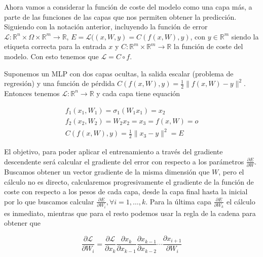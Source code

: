 Ahora vamos a considerar la función de coste del modelo como una capa más, a parte de las funciones de las capas que nos permiten obtener la predicción. Siguiendo con la notación anterior, incluyendo la función de error $\mathcal{L}: \mathbb{R}^n \times \Omega \times \mathbb{R}^m \rightarrow \mathbb{R}$, $E=\mathcal{L}((x,W,y)= C(f(x,W),y)$, con $y \in \mathbb{R}^m$ siendo la etiqueta correcta para la entrada $x$ y $C: \mathbb{R}^m \times \mathbb{R}^m \rightarrow \mathbb{R}$ la función de coste del modelo. Con esto tenemos que $\mathcal{L} = C \circ f$. 


\begin{ejemplo}
    Suponemos un MLP con dos capas ocultas, la salida escalar (problema de regresión) y una función de pérdida $C(f(x,W),y)=\frac{1}{2} \| f(x,W) - y\|^2$. Entonces tenemos $\mathcal{L}:\mathbb{R}^n \rightarrow \mathbb{R}$ y cada capa tiene equación

    
    
    \begin{gather*}
    f_1(x_1, W_1)=\sigma_1(W_1x_1)=x_2 \\
      f_2(x_2, W_2)=W_2x_2=x_3=f(x,W)=o  \\
      C(f(x,W),y)= \frac{1}{2} \| x_3 - y \|^2 = E
    \end{gather*}

    


\end{ejemplo}

El objetivo, para poder aplicar el entrenamiento a través del gradiente descendente será calcular el gradiente del error con respecto a los parámetros $\frac{\partial E}{\partial W}$. Buscamos obtener un vector gradiente de la misma dimensión que $W$, pero el cálculo no es directo, calcularemos progresivamente el gradiente de la función de coste con respecto a los pesos de cada capa, desde la capa final hasta la inicial por lo que buscamos calcular $\frac{\partial E}{\partial W_i}, \forall i=1,\ldots,k$.  Para la última capa $\frac{\partial E}{\partial W_k}$ el cálculo es inmediato, mientras que para el resto podemos usar la regla de la cadena para obtener que 

$$\frac{\partial \mathcal{L}}{\partial W_i}=\frac{\partial \mathcal{L}}{\partial x_k} \frac{\partial x_k}{\partial x_{k-1}} \frac{\partial x_{k-1}}{\partial x_{k-2}} \cdots \frac{\partial x_{i+1}}{\partial W_i}$$

